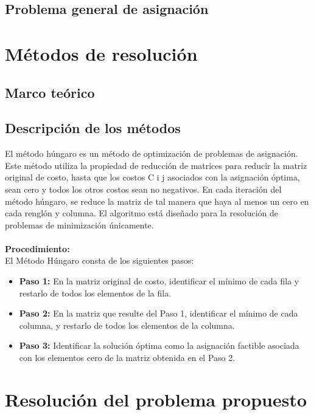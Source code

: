 \documentclass[11pt]{article}
\begin{document}
\subsection{Problema general de asignación}



\section{Métodos de resolución}
\subsection{Marco teórico}


\subsection{Descripción de los métodos}
\label{ref:metodohúngaro} El método húngaro es un método de optimización de problemas de asignación. 
Este método utiliza la propiedad de reducción de matrices para reducir la matriz original de costo, hasta que los costos C i j asociados con la asignación óptima, sean cero y todos los otros costos sean no negativos. En cada iteración del método húngaro, se reduce la matriz de tal manera que haya al menos un cero en cada renglón y columna. El algoritmo está diseñado para la resolución de problemas de minimización únicamente.\\\\
\textbf{Procedimiento:}\\
El Método Húngaro consta de los siguientes pasos:\\

\begin{itemize}
    \item \textbf{Paso 1:} En la matriz original de costo, identificar el mínimo de cada fila y restarlo de todos los elementos de la fila.
    \item \textbf{Paso 2:} En la matriz que resulte del Paso 1, identificar el mínimo de cada columna, y restarlo de todos los elementos de la columna.
    \item \textbf{Paso 3:} Identificar la solución óptima como la asignación factible asociada con los elementos cero de la matriz obtenida en el Paso 2.
\end{itemize}




\section{Resolución del problema propuesto}
\end{document}

